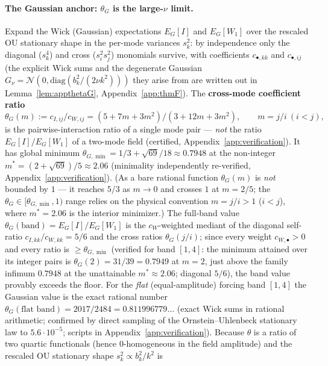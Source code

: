 \documentclass[11pt]{article}
\theoremstyle{remark}
\theoremstyle{plain}
\newcommand{\eqdef}{:=}
\begin{document}
\paragraph{The Gaussian anchor: $\theta_G$ is the large-$\nu$ limit.} Expand the Wick
(Gaussian) expectations $E_G[I]$ and $E_G[W_1]$ over the rescaled OU stationary shape in the
per-mode variances $s_k^2$: by independence only the diagonal ($s_k^4$) and cross
($s_i^2 s_j^2$) monomials survive, with coefficients $c_{\bullet,kk}$ and $c_{\bullet,ij}$
(the explicit Wick sums and the degenerate Gaussian $G_\nu = \mathcal{N}(0,\mathrm{diag}(b_k^2/(2\nu k^2)))$
they arise from are written out in Lemma~\ref{lem:appthetaG}, Appendix~\ref{app:thmF}).
The \textbf{cross-mode coefficient ratio}
\begin{equation}
   \theta_G(m) \eqdef c_{I,ij}/c_{W,ij} = (5+7m+3m^2)/(3+12m+3m^2), \qquad m = j/i\ (i<j),
\end{equation}
is the pairwise-interaction ratio of a single mode pair --- \emph{not} the ratio
$E_G[I]/E_G[W_1]$ of a two-mode field (certified, Appendix~\ref{app:verification}). It has global
minimum $\theta_{G,\min} = 1/3 + \sqrt{69}/18 \approx 0.7948$ at the non-integer
$m^* = (2+\sqrt{69})/5 \approx 2.06$ (minimality
independently re-verified, Appendix~\ref{app:verification}). (As a bare rational function $\theta_G(m)$
is \emph{not} bounded by $1$ --- it reaches $5/3$ as $m\to0$ and crosses $1$ at $m=2/5$; the
$\theta_G\in[\theta_{G,\min},1)$ range relies on the physical convention
$m=j/i>1$ ($i<j$), where $m^*=2.06$ is the interior minimizer.) The full-band value
$\theta_G(\text{band}) = E_G[I]/E_G[W_1]$ is the $c_W$-weighted mediant of the diagonal
self-ratio $c_{I,kk}/c_{W,kk} = 5/6$ and the cross ratios $\theta_G(j/i)$; since every weight
$c_{W,\bullet} > 0$ and every ratio is $\ge \theta_{G,\min}$ (verified for band $[1,4]$: the
minimum attained over its integer pairs is $\theta_G(2) = 31/39 = 0.7949$ at $m = 2$,
just above the family infimum $0.7948$ at the unattainable $m^* \approx 2.06$; diagonal
$5/6$), the band value provably exceeds the floor.
For the \emph{flat} (equal-amplitude) forcing band $[1,4]$ the
Gaussian value is the exact rational number $\theta_G(\text{flat band}) = 2017/2484 =
0.811996779\ldots$ (exact Wick sums in rational arithmetic; confirmed by direct sampling
of the Ornstein--Uhlenbeck stationary law to $5.6\cdot10^{-5}$; scripts in Appendix~\ref{app:verification}).
Because $\theta$ is a ratio of two quartic functionals (hence $0$-homogeneous in the field
amplitude) and the rescaled OU stationary shape $s_k^2 \propto b_k^2/k^2$ is
\end{document}
